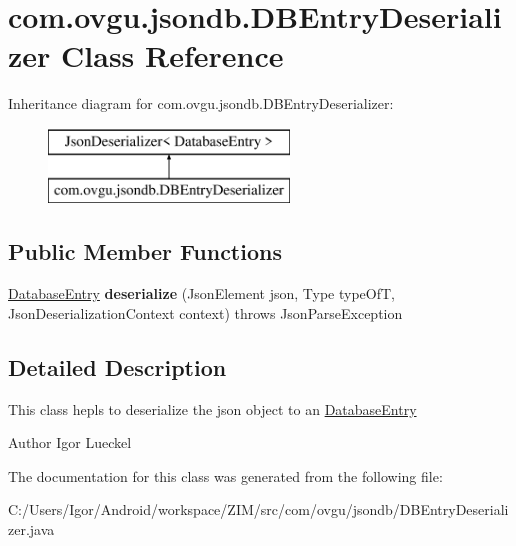 \hypertarget{classcom_1_1ovgu_1_1jsondb_1_1_d_b_entry_deserializer}{\section{com.\-ovgu.\-jsondb.\-D\-B\-Entry\-Deserializer Class Reference}
\label{classcom_1_1ovgu_1_1jsondb_1_1_d_b_entry_deserializer}
}
Inheritance diagram for com.\-ovgu.\-jsondb.\-D\-B\-Entry\-Deserializer\-:\begin{figure}[H]
\begin{center}
\leavevmode
\includegraphics[height=2.000000cm]{classcom_1_1ovgu_1_1jsondb_1_1_d_b_entry_deserializer}
\end{center}
\end{figure}
\subsection*{Public Member Functions}
\begin{DoxyCompactItemize}
\item 
\hypertarget{classcom_1_1ovgu_1_1jsondb_1_1_d_b_entry_deserializer_ae7ecca25a610bfa3faa821f3d9e96513}{\hyperlink{classcom_1_1ovgu_1_1util_1_1_database_entry}{Database\-Entry} {\bfseries deserialize} (Json\-Element json, Type type\-Of\-T, Json\-Deserialization\-Context context)  throws Json\-Parse\-Exception }\label{classcom_1_1ovgu_1_1jsondb_1_1_d_b_entry_deserializer_ae7ecca25a610bfa3faa821f3d9e96513}

\end{DoxyCompactItemize}


\subsection{Detailed Description}
This class hepls to deserialize the json object to an \hyperlink{}{Database\-Entry} \begin{DoxyAuthor}{Author}
Igor Lueckel 
\end{DoxyAuthor}


The documentation for this class was generated from the following file\-:\begin{DoxyCompactItemize}
\item 
C\-:/\-Users/\-Igor/\-Android/workspace/\-Z\-I\-M/src/com/ovgu/jsondb/D\-B\-Entry\-Deserializer.\-java\end{DoxyCompactItemize}
